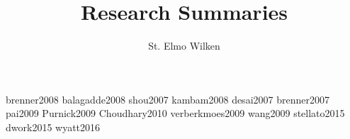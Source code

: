 \documentclass[11pt,fleqn]{article}
\begin{document}
\title{Research Summaries}
\author{St. Elmo Wilken}
\maketitle

{brenner2008}
{balagadde2008}
{shou2007}
{kambam2008}
{desai2007}
{brenner2007}
{pai2009}
{Purnick2009}
{Choudhary2010}
{verberkmoes2009}
{wang2009}
{stellato2015}
{dwork2015}
{wyatt2016}



\end{document}
